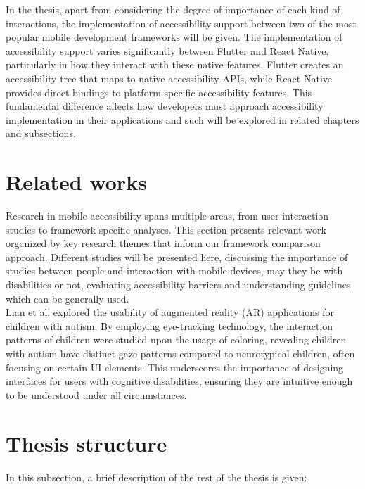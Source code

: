 In the thesis, apart from considering the degree of importance of each kind of interactions, the implementation of accessibility support between two of the most popular mobile development frameworks will be given. The implementation of accessibility support varies significantly between Flutter and React Native, particularly in how they interact with these native features. Flutter creates an accessibility tree that maps to native accessibility APIs, while React Native provides direct bindings to platform-specific accessibility features. This fundamental difference affects how developers must approach accessibility implementation in their applications and such will be explored in related chapters and subsections.

\section{Related works}
\label{chap:intro-related-works}

Research in mobile accessibility spans multiple areas, from user interaction studies to framework-specific analyses. This section presents relevant work organized by key research themes that inform our framework comparison approach. Different studies will be presented here, discussing the importance of studies between people and interaction with mobile devices, may they be with disabilities or not, evaluating accessibility barriers and understanding guidelines which can be generally used. \\

Lian et al. \cite{lian2021autism} explored the usability of augmented reality (AR) applications for children with autism. By employing eye-tracking technology, the interaction patterns of children were studied upon the usage of coloring, revealing children with autism have distinct gaze patterns compared to neurotypical children, often focusing on certain UI elements. This underscores the importance of designing interfaces for users with cognitive disabilities, ensuring they are intuitive enough to be understood under all circumstances.

\section{Thesis structure}
\label{chap:intro-structure} 

In this subsection, a brief description of the rest of the thesis is given:

